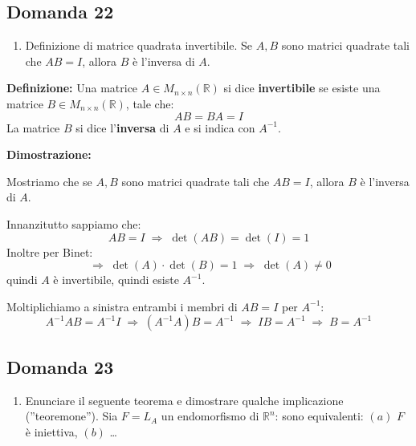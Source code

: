 \documentclass[
  a4paper,
]{article}
\providecommand{\tightlist}{%
  \setlength{\itemsep}{0pt}\setlength{\parskip}{0pt}}
\providecommand{\tightlist}{}
\begin{document}
\hypertarget{domanda-22}{%
\subsection{Domanda 22}\label{domanda-22}}

\begin{observationbox}[Domanda]
\begin{enumerate}
\def\labelenumi{\arabic{enumi}.}
\setcounter{enumi}{21}
\tightlist
\item
  Definizione di matrice quadrata invertibile. Se \(A,B\) sono matrici
  quadrate tali che \(AB=I\), allora \(B\) è l'inversa di \(A\).
\end{enumerate}
\end{observationbox}

\textbf{Definizione:} Una matrice \(A \in M_{n\times n}(\mathbb{R})\) si
dice \textbf{invertibile} se esiste una matrice
\(B \in M_{n\times n}(\mathbb{R})\), tale che: \[
AB = BA = I
\]La matrice \(B\) si dice l'\textbf{inversa} di \(A\) e si indica con
\(A^{-1}\).

\textbf{Dimostrazione:}

Mostriamo che se \(A,B\) sono matrici quadrate tali che \(AB=I\), allora
\(B\) è l'inversa di \(A\).

Innanzitutto sappiamo che: \[
AB = I \;\Longrightarrow\; \det(AB) = \det(I) = 1
\] Inoltre per Binet: \[
\;\Longrightarrow\; \det(A)\cdot\det(B) = 1 \;\Longrightarrow\; \det(A) \not = 0
\] quindi \(A\) è invertibile, quindi esiste \(A^{-1}\).

Moltiplichiamo a sinistra entrambi i membri di \(AB = I\) per
\(A^{-1}\): \[
A^{-1}AB = A^{-1}I \;\Longrightarrow\; (A^{-1}A)B = A^{-1} \;\Longrightarrow\; IB = A^{-1} \;\Longrightarrow\; B = A^{-1}
\]

\hypertarget{domanda-23}{%
\subsection{Domanda 23}\label{domanda-23}}

\begin{observationbox}[Domanda]
\begin{enumerate}
\def\labelenumi{\arabic{enumi}.}
\setcounter{enumi}{22}
\tightlist
\item
  Enunciare il seguente teorema e dimostrare qualche implicazione
  (''teoremone''). Sia \(F=L_A\) un endomorfismo di \(\mathbb{R}^n\):
  sono equivalenti: \((a)\) \(F\) è iniettiva, \((b)\) \ldots{}
\end{enumerate}
\end{observationbox}
\end{document}
